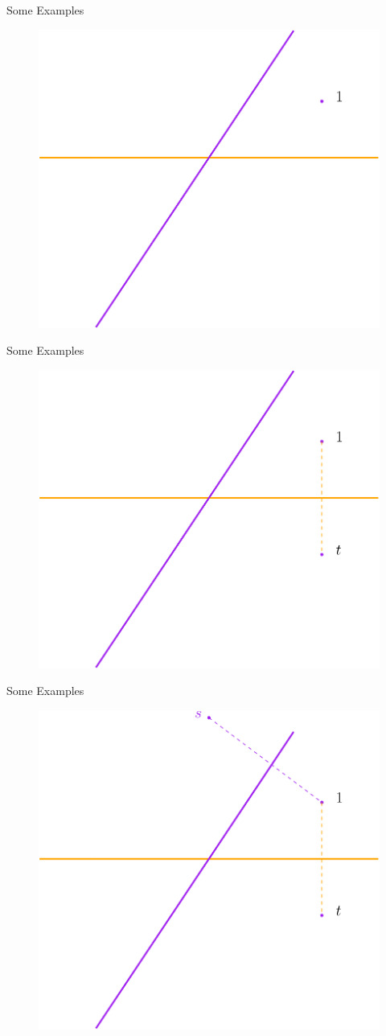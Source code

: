 \documentclass[aspectratio=169,xcolor=dvipsnames]{beamer}
\begin{document}


\begin{frame}{Some Examples}
    \begin{figure}
        \centering
        \includegraphics[width=0.5\linewidth]{frameN-6.png}
        \label{fig:enter-label}
    \end{figure}
\end{frame}


\begin{frame}{Some Examples}
    \begin{figure}
        \centering
        \includegraphics[width=0.5\linewidth]{frameN-5.png}
        \label{fig:enter-label}
    \end{figure}
\end{frame}

\begin{frame}{Some Examples}
    \begin{figure}
        \centering
        \includegraphics[width=0.5\linewidth]{frameN-4.png}
        \label{fig:enter-label}
    \end{figure}
\end{frame}
\end{document}
